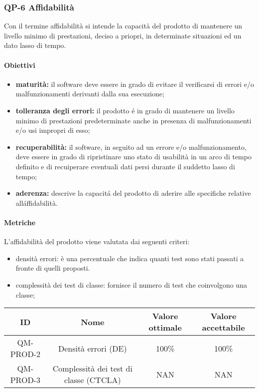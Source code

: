 \subsubsection{QP-6 Affidabilità}
Con il termine affidabilità si intende la capacità del prodotto di mantenere un livello minimo di prestazioni, deciso a priopri, in determinate situazioni ed un dato lasso di tempo.
	\paragraph{Obiettivi}
		\begin{itemize}
			\item \textbf{maturità:} il software deve essere in grado di evitare il verificarsi di errori e/o malfunzionamenti derivanti dalla sua esecuzione;
			\item \textbf{tolleranza degli errori:} il prodotto é in grado di mantenere un livello minimo di prestazioni predeterminate anche in presenza di malfunzionamenti e/o usi impropri di esso;
			\item \textbf{recuperabilità:} il software, in seguito ad un errore e/o malfunzionamento, deve essere in grado di ripristinare uno stato di usabilità in un arco di tempo definito e di recuiperare eventuali dati persi durante il suddetto lasso di tempo;
			\item \textbf{aderenza:} descrive la capacitá del prodotto di aderire alle specifiche relative alláffidabilità.
		\end{itemize}
	\paragraph{Metriche}
	L'affidabilità del prodotto viene valutata dai seguenti criteri:
	\begin{itemize}
		\item densità errori: è una percentuale che indica quanti test sono stati passati a fronte di quelli proposti.
		\item complessità dei test di classe: fornisce il numero di test che coinvolgono una classe;
	\end{itemize}
	\begin{center}
		\begin{tabular}{|c|c|c|c|}
			\hline
			ID & Nome & Valore ottimale & Valore accettabile \\
			\hline
			QM-PROD-2 & Densità errori (DE) & 100\% & 100\% \\
			\hline
			QM-PROD-3 & Complessità dei test di classe (CTCLA) & NAN & NAN \\
			\hline
		\end{tabular}
	\end{center}
